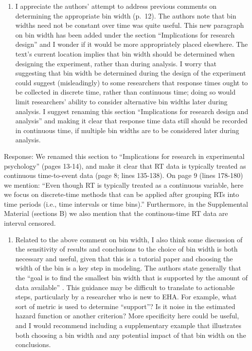 \documentclass[
]{article}
\providecommand{\tightlist}{%
  \setlength{\itemsep}{0pt}\setlength{\parskip}{0pt}}
\renewenvironment{quote}{\begin{leftbar}}{\end{leftbar}}
\begin{document}
\begin{quote}
\begin{enumerate}
\def\labelenumi{\arabic{enumi}.}
\tightlist
\item
  I appreciate the authors' attempt to address previous comments on
  determining the appropriate bin width (p.~12). The authors note that
  bin widths need not be constant over time was quite useful. This new
  paragraph on bin width has been added under the section ``Implications
  for research design'' and I wonder if it would be more appropriately
  placed elsewhere. The text's current location implies that bin width
  should be determined when designing the experiment, rather than during
  analysis. I worry that suggesting that bin width be determined during
  the design of the experiment could suggest (misleadingly) to some
  researchers that response times ought to be collected in discrete
  time, rather than continuous time; doing so would limit researchers'
  ability to consider alternative bin widths later during analysis. I
  suggest renaming this section ``Implications for research design and
  analysis'' and making it clear that response time data still should be
  recorded in continuous time, if multiple bin widths are to be
  considered later during analysis.
\end{enumerate}
\end{quote}

Response: We renamed this section to ``Implications for research in
experimental psychology'' (pages 13-14), and make it clear that RT data
is typically treated as continuous time-to-event data (page 8; lines
135-138). On page 9 (lines 178-180) we mention: ``Even though RT is
typically treated as a continuous variable, here we focus on
discrete-time methods that can be applied after grouping RTs into time
periods (i.e., time intervals or time bins).'' Furthermore, in the
Supplemental Material (sections B) we also mention that the
continous-time RT data are interval censored.

\begin{quote}
\begin{enumerate}
\def\labelenumi{\arabic{enumi}.}
\setcounter{enumi}{1}
\tightlist
\item
  Related to the above comment on bin width, I also think some
  discussion of the sensitivity of results and conclusions to the choice
  of bin width is both necessary and useful, given that this is a
  tutorial paper and choosing the width of the bin is a key step in
  modeling. The authors state generally that the ``goal is to find the
  smallest bin width that is supported by the amount of data available''
  . This guidance may be difficult to translate to actionable steps,
  particularly by a researcher who is new to EHA. For example, what sort
  of metric is used to determine ``support''? Is it noise in the
  estimated hazard function or another criterion? More specificity here
  could be useful, and I would recommend including a supplementary
  example that illustrates both choosing a bin width and any potential
  impact of that bin width on the conclusions.
\end{enumerate}
\end{quote}
\end{document}
